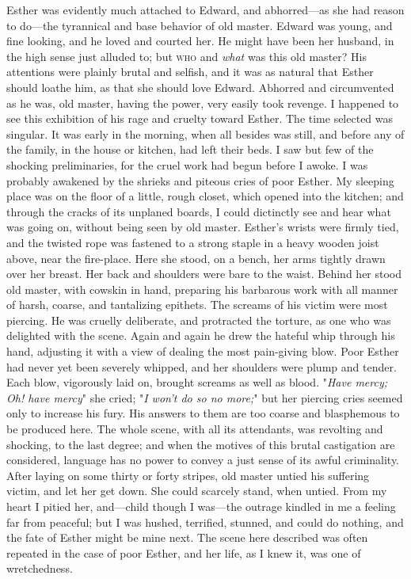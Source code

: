 Esther was evidently much attached to Edward, and abhorred---as she had
reason to do---the tyrannical and base behavior of old master. Edward
was young, and fine looking, and he loved and courted {}her. He might
have been her husband, in the high sense just alluded to; but
\textsc{who} and \emph{what} was this old master? His attentions were
plainly brutal and selfish, and it was as natural that Esther should
loathe him, as that she should love Edward. Abhorred and circumvented as
he was, old master, having the power, very easily took revenge. I
happened to see this exhibition of his rage and cruelty toward Esther.
The time selected was singular. It was early in the morning, when all
besides was still, and before any of the family, in the house or
kitchen, had left their beds. I saw but few of the shocking
preliminaries, for the cruel work had begun before I awoke. I was
probably awakened by the shrieks and piteous cries of poor Esther. My
sleeping place was on the floor of a little, rough closet, which opened
into the kitchen; and through the cracks of its unplaned boards, I could
dictinctly see and hear what was going on, without being seen by old
master. Esther's wrists were firmly tied, and the twisted rope was
fastened to a strong staple in a heavy wooden joist above, near the
fire-place. Here she stood, on a bench, her arms tightly drawn over her
breast. Her back and shoulders were bare to the waist. Behind her stood
old master, with cowskin in hand, preparing his barbarous work with all
manner of harsh, coarse, and tantalizing epithets. The screams of his
victim were most piercing. He was cruelly deliberate, and protracted the
torture, as one who was delighted with the scene. Again and again he
drew the hateful whip through his hand, adjusting it with a view of
dealing the most pain-giving blow. Poor Esther had never yet been
{}severely whipped, and her shoulders were plump and tender. Each blow,
vigorously laid on, brought screams as well as blood. "\emph{Have mercy;
Oh! have mercy}" she cried; "\emph{I won't do so no more;}" but her
piercing cries seemed only to increase his fury. His answers to them are
too coarse and blasphemous to be produced here. The whole scene, with
all its attendants, was revolting and shocking, to the last degree; and
when the motives of this brutal castigation are considered, language has
no power to convey a just sense of its awful criminality. After laying
on some thirty or forty stripes, old master untied his suffering victim,
and let her get down. She could scarcely stand, when untied. From my
heart I pitied her, and---child though I was---the outrage kindled in me
a feeling far from peaceful; but I was hushed, terrified, stunned, and
could do nothing, and the fate of Esther might be mine next. The scene
here described was often repeated in the case of poor Esther, and her
life, as I knew it, was one of wretchedness.
